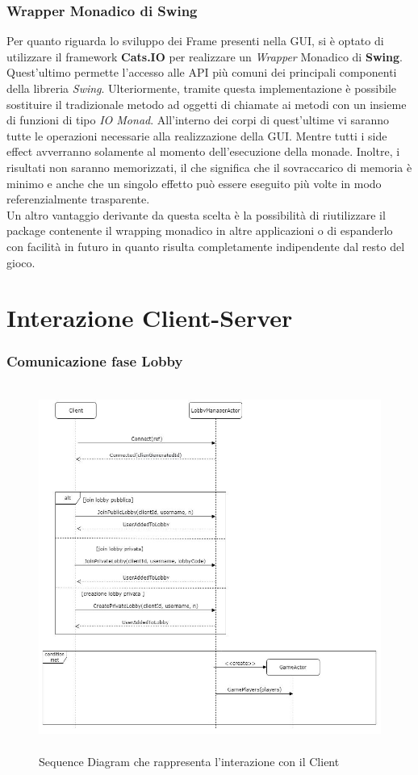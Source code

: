 \subsubsection{Wrapper Monadico di Swing}
Per quanto riguarda lo sviluppo dei Frame presenti nella GUI, si \`e optato di utilizzare il framework \textbf{Cats.IO} per realizzare un \textit{Wrapper} Monadico di \textbf{Swing}. Quest'ultimo permette l'accesso alle API pi\`u comuni dei principali componenti della libreria \textit{Swing}. Ulteriormente, tramite questa implementazione \`e possibile sostituire il tradizionale metodo ad oggetti di chiamate ai metodi con un insieme di funzioni di tipo \textit{IO Monad}. All'interno dei corpi di quest'ultime vi saranno tutte le operazioni necessarie alla realizzazione della GUI. Mentre tutti i side effect avverranno solamente al momento dell'esecuzione della monade. Inoltre, i risultati non saranno memorizzati, il che significa che il sovraccarico di memoria \`e minimo e anche che un singolo effetto pu\`o essere eseguito pi\`u volte in modo referenzialmente trasparente.\\
Un altro vantaggio derivante da questa scelta \`e la possibilità di riutilizzare il package contenente il wrapping monadico in altre applicazioni o di espanderlo con facilit\`a in futuro in quanto risulta completamente indipendente dal resto del gioco.

\newpage
\section{Interazione Client-Server}
\subsubsection{Comunicazione fase Lobby}

\begin{figure}[ht]
\centering
\includegraphics[width=13cm, height=12cm]{img/InteractionWithClient.jpg}
\caption{Sequence Diagram che rappresenta l'interazione con il Client}
\label{fig:ClasDiagRaprInterazClient}
\end{figure}

